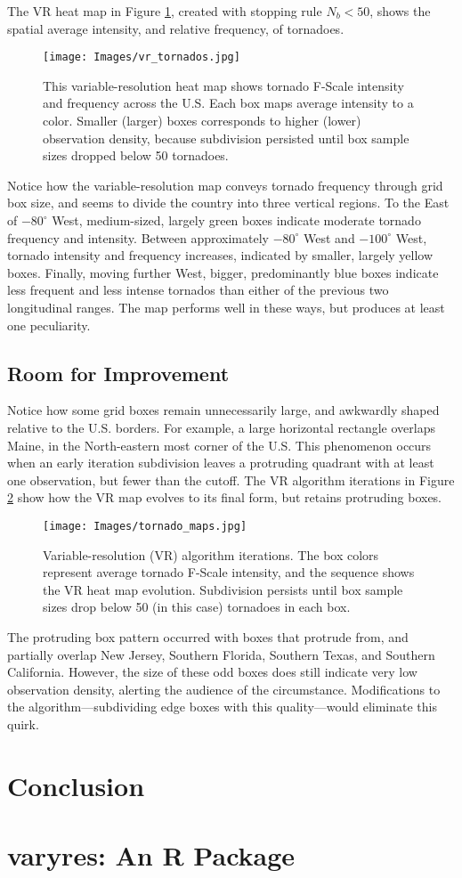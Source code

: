 The VR heat map in Figure \ref{fig:tornado1}, created with stopping rule $N_{b} < 50$, shows the spatial average intensity, and relative frequency, of tornadoes.
        \begin{figure}[H]
      	\centering      
      	\texttt{[image: Images/vr\_tornados.jpg]}
      	\caption{This variable-resolution heat map shows tornado F-Scale intensity and frequency across the U.S. Each box maps average intensity to a color. Smaller (larger) boxes corresponds to higher (lower) observation density, because subdivision persisted until box sample sizes dropped below 50 tornadoes.}
      	\label{fig:tornado1}
        \end{figure}
Notice how the variable-resolution map conveys tornado frequency through grid box size, and seems to divide the country into three vertical regions. To the East of $-80^{\circ}$ West, medium-sized, largely green boxes indicate moderate tornado frequency and intensity. Between approximately $-80^{\circ}$ West and $-100^{\circ}$ West, tornado intensity and frequency increases, indicated by smaller, largely yellow boxes. Finally, moving further West, bigger, predominantly blue boxes indicate less frequent and less intense tornados than either of the previous two longitudinal ranges. The map performs well in these ways, but produces at least one peculiarity.

\subsection{Room for Improvement}

Notice how some grid boxes remain unnecessarily large, and awkwardly shaped relative to the U.S. borders. For example, a large horizontal rectangle overlaps Maine, in the North-eastern most corner of the U.S. This phenomenon occurs when an early iteration subdivision leaves a protruding quadrant with at least one observation, but fewer than the cutoff. The VR algorithm iterations in Figure \ref{fig:tornado2} show how the VR map evolves to its final form, but retains protruding boxes.
        \begin{figure}[H]
      	\centering      
      	\texttt{[image: Images/tornado\_maps.jpg]}
      	\caption{Variable-resolution (VR) algorithm iterations. The box colors represent average tornado F-Scale intensity, and the sequence shows the VR heat map evolution. Subdivision persists until box sample sizes drop below 50 (in this case) tornadoes in each box.}
      	\label{fig:tornado2}
        \end{figure}
The protruding box pattern occurred with boxes that protrude from, and partially overlap New Jersey, Southern Florida, Southern Texas, and Southern California. However, the size of these odd boxes does still indicate very low observation density, alerting the audience of the circumstance. Modifications to the algorithm---subdividing edge boxes with this quality---would eliminate this quirk.

\section{Conclusion}

\section{{\bf varyres}: An R Package}